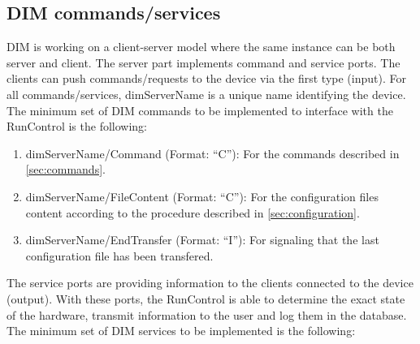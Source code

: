 \documentclass[a4paper]{article}
\begin{document}
\subsection{DIM commands/services} \label{sec:DIM}
DIM is working on a client-server model where the same instance can be both server and client.
The server part implements command and service ports. The clients can push commands/requests to
the device via the first type (input). For all commands/services, dimServerName is a unique name
identifying the device. The minimum set of DIM commands to be implemented to interface with the
RunControl is the following:
\begin{enumerate}[label=\textbf{CMD.\arabic*}]
	\item \label{cmd:command} dimServerName/Command (Format: ``C''): For the commands described in
	\ref{sec:commands}.
	\item \label{cmd:fileContent} dimServerName/FileContent (Format: ``C''): For the configuration
	files content according to the procedure described in \ref{sec:configuration}.
	\item \label{cmd:endTransfer} dimServerName/EndTransfer (Format: ``I''): For signaling that the
	last configuration file has been transfered.
\end{enumerate}
The service ports are providing information to the clients connected to the device (output).
With these ports, the RunControl is able to determine the exact state of the hardware,
transmit information to the user and log them in the database. The minimum set of DIM services to
be implemented is the following:
\end{document}
